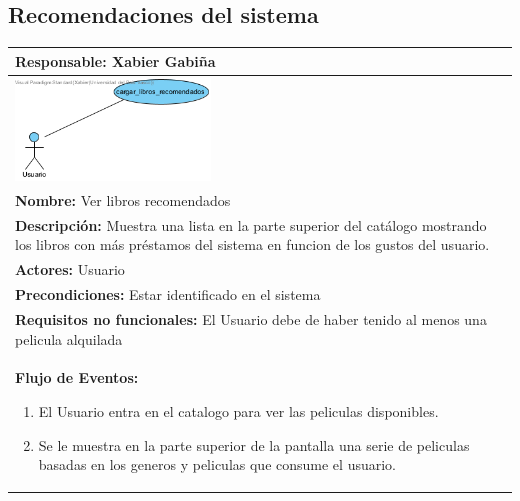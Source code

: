 \documentclass{report}
\begin{document}
        \subsection{Recomendaciones del sistema}
            \begin{center}
                \begin{longtable}{|p{\linewidth}|}
                    \hline
                    \textbf{Responsable:} Xabier Gabiña\\
                    \hline
                    \begin{minipage}{\textwidth}
                        \centering
                        \includegraphics[width=0.4\textwidth]{./img/casos_uso/recom_lib.png}
                    \end{minipage}\\
                    \hline
                    \textbf{Nombre:} Ver libros recomendados\\
                    \hline
                    \textbf{Descripción:} Muestra una lista en la parte superior del catálogo mostrando los libros con más préstamos del sistema en funcion de los gustos del usuario.\\
                    \hline
                    \textbf{Actores:} Usuario\\
                    \hline
                    \textbf{Precondiciones:} Estar identificado en el sistema\\
                    \hline
                    \textbf{Requisitos no funcionales:} El Usuario debe de haber tenido al menos una pelicula alquilada\\
                    \hline
                    \textbf{Flujo de Eventos:}
                    \begin{enumerate}
                        \item El Usuario entra en el catalogo para ver las peliculas disponibles.
                        \item Se le muestra en la parte superior de la pantalla una serie de peliculas basadas en los generos y peliculas que consume el usuario.
                    \end{enumerate}\\

\end{longtable}
\end{center}
\end{document}
